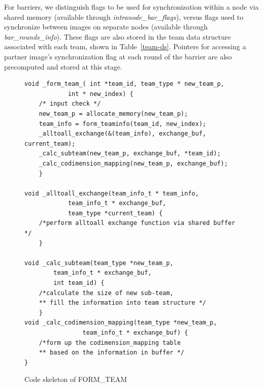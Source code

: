  For barriers, we
distinguish flags to be used for synchronization within a node via shared
memory (available through \textit{intranode\_bar\_flags}),
versus flags used to synchronize between images on separate nodes (available
through \textit{bar\_rounds\_info}). These flags are also stored in the team
data structure associated with each team, shown in Table~\ref{team-ds}.
Pointers for accessing a partner image's
synchronization flag at each round of the barrier are also precomputed and
stored at this stage.

\begin{figure}[H]
    \begin{minipage}{0.35\columnwidth}
    \begin{lstlisting}
void _form_team_( int *team_id, team_type * new_team_p,
			int * new_index) {
	/* input check */
	new_team_p = allocate_memory(new_team_p);
	team_info = form_teaminfo(team_id, new_index);
	_alltoall_exchange(&(team_info), exchange_buf, current_team);
	_calc_subteam(new_team_p, exchange_buf, *team_id);
	_calc_codimension_mapping(new_team_p, exchange_buf);
	}

void _alltoall_exchange(team_info_t * team_info, 
			team_info_t * exchange_buf, 
			team_type *current_team) {
	/*perform alltoall exchange function via shared buffer */
	}

void _calc_subteam(team_type *new_team_p, 
		team_info_t * exchange_buf, 
		int team_id) {
	/*calculate the size of new sub-team, 
	** fill the information into team structure */
	}
void _calc_codimension_mapping(team_type *new_team_p, 
				team_info_t * exchange_buf) {
	/*form up the codimension_mapping table
	** based on the information in buffer */
}
\end{lstlisting}
\end{minipage}
\caption{Code skeleton of FORM\_TEAM}
\label{fig:demo-form-team}
\end{figure}


